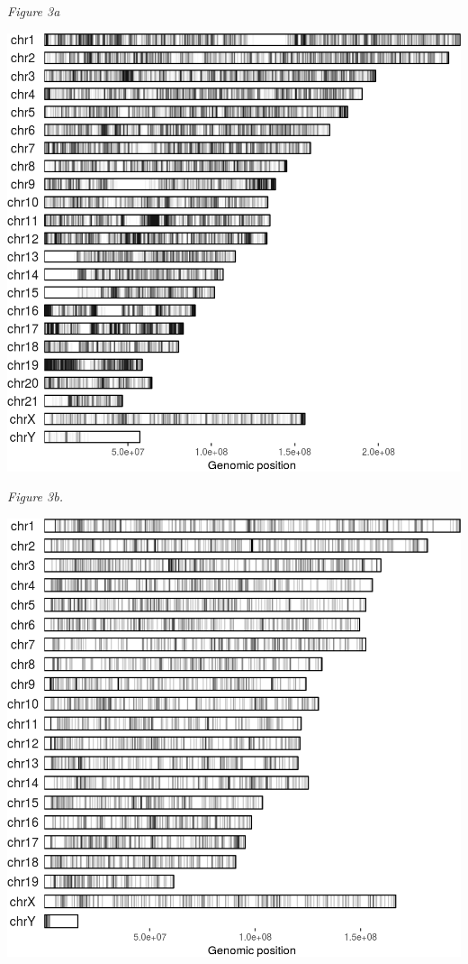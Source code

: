 \documentclass[12pt,]{article}
\begin{document}
\emph{Figure 3a}

\includegraphics{project_files/figure-latex/fig3a-1.png}

\newpage

\emph{Figure 3b.}

\includegraphics{project_files/figure-latex/fig3b-1.png}
\end{document}
